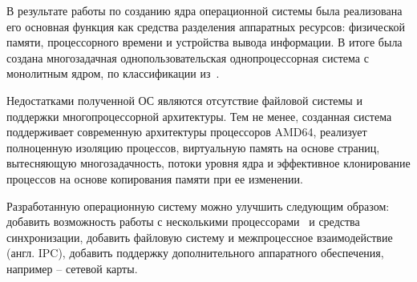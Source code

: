 \Conclusion

В результате работы по созданию ядра операционной системы была реализована его
основная функция как средства разделения аппаратных ресурсов: физической памяти,
процессорного времени и устройства вывода информации. В итоге была создана
многозадачная однопользовательская однопроцессорная система с монолитным ядром,
по классификации из~\cite{tanenbaum}.

Недостатками полученной ОС являются отсутствие файловой системы и поддержки
многопроцессорной архитектуры. Тем не менее, созданная система поддерживает
современную архитектуры процессоров AMD64, реализует
полноценную изоляцию процессов, виртуальную память на основе страниц, вытесняющую
многозадачность, потоки уровня ядра и эффективное клонирование процессов на
основе копирования памяти при ее изменении.

Разработанную операционную систему можно улучшить следующим образом: добавить возможность
работы с несколькими процессорами~\cite{mp} и средства синхронизации,
добавить файловую систему и межпроцессное взаимодействие (англ. IPC), добавить
поддержку дополнительного аппаратного обеспечения, например -- сетевой карты.
